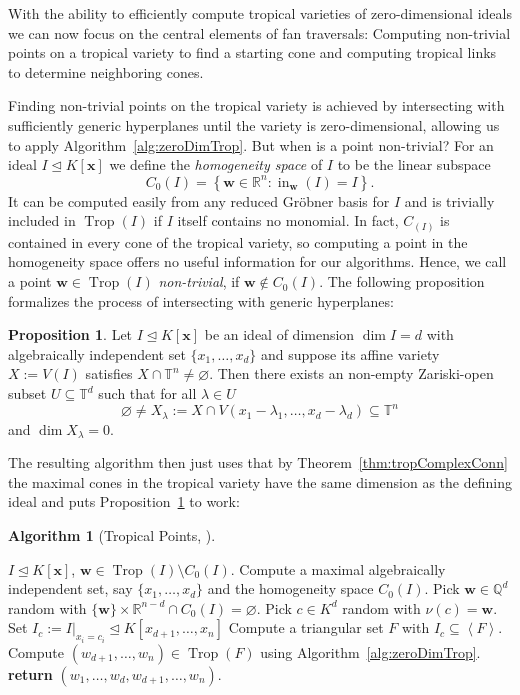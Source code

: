\documentclass[
  paper=a4,
  titlepage,
  bibliography=totoc,
  listof=totoc,
  pagesize=pdftex
]{scrartcl}
\numberwithin{figure}{section}
\numberwithin{equation}{section}
\numberwithin{table}{section}
\newcommand*\setR{\mathds{R}}
\newcommand*\setQ{\mathds{Q}}
\newcommand*\setT{\mathds{T}}
\newcommand*\ideal[1]{\left\langle #1 \right\rangle}
\let\vec\mathbf
\let\idealof\trianglelefteq
\DeclareMathOperator{\Trop}{Trop}
\DeclareMathOperator{\initial}{in}
\theoremstyle{definition}
\newtheorem{proposition}[definition]{Proposition}
\newtheorem{algo}[definition]{Algorithm}
\numberwithin{definition}{section}
\begin{document}
With the ability to efficiently compute tropical varieties of zero-dimensional ideals we
can now focus on the central elements of fan traversals: Computing non-trivial points on a
tropical variety to find a starting cone and computing tropical links to determine
neighboring cones.

Finding non-trivial points on the tropical variety is achieved by intersecting with
sufficiently generic hyperplanes until the variety is zero-dimensional, allowing us to
apply Algorithm~\ref{alg:zeroDimTrop}. But when is a point non-trivial? For an ideal $I
\idealof K[\vec x]$ we define the \emph{homogeneity space} of $I$ to be the linear
subspace
\[
  C_0(I) = \left\{ \vec w \in \setR^n : \initial_{\vec w}(I) = I \right\}.
\]
It can be computed easily from any reduced Gröbner basis for $I$ and is trivially included
in $\Trop(I)$ if $I$ itself contains no monomial. In fact, $C_(I)$ is contained in every
cone of the tropical variety, so computing a point in the homogeneity space offers no
useful information for our algorithms. Hence, we call a point $\vec w \in \Trop(I)$
\emph{non-trivial}, if $\vec w \not\in C_0(I)$. The following proposition formalizes the
process of intersecting with generic hyperplanes:

\begin{proposition}
  Let $I \idealof K[\vec x]$ be an ideal of dimension $\dim I = d$ with algebraically
  independent set $\{x_1, \dots, x_d\}$ and suppose its affine variety $X := V(I)$
  satisfies $X \cap \setT^n \neq \varnothing$. Then there exists an non-empty Zariski-open
  subset $U \subseteq \setT^d$ such that for all $\lambda \in U$
  \[
    \varnothing \neq X_\lambda :=
    X \cap V(x_1-\lambda_1, \dots, x_d - \lambda_d) \subseteq \setT^n
  \]
  and $\dim X_\lambda = 0$.
  \label{prp:intersHyperp}
\end{proposition}

The resulting algorithm then just uses that by Theorem~\ref{thm:tropComplexConn} the
maximal cones in the tropical variety have the same dimension as the defining ideal and
puts Proposition~\ref{prp:intersHyperp} to work:

\begin{algo}[Tropical Points, {\cite[Algorithm~3.3]{tropPointsLinks}}] $ $
  \begin{algorithmic}[1]
    \Require $I \idealof K[\vec x]$,
    \Ensure $\vec w \in \Trop(I) \setminus C_0(I)$.
    \State Compute a maximal algebraically independent set, say $\{x_1, \dots, x_d\}$ and
    the homogeneity space $C_0(I)$.
    \Repeat
      \State Pick $\vec w \in \setQ^d$ random with $\{\vec w\} \times \setR^{n-d} \cap
        C_0(I) = \varnothing$.
      \State Pick $c \in K^d$ random with $\nu(c) = \vec w$.
      \State Set $I_c := I|_{x_i = c_i} \idealof K[x_{d+1}, \dots, x_n]$
    \Until{$\dim(I_c) = 0$ and $V(I_c) \subseteq \setT^{n-d}$}
    \State Compute a triangular set $F$ with $I_c \subseteq \ideal F$.
    \State Compute $(w_{d+1}, \dots, w_n) \in \Trop(F)$ using
      Algorithm~\ref{alg:zeroDimTrop}.
    \State\textbf{return} $(w_1, \dots, w_d, w_{d+1}, \dots, w_n)$.
  \end{algorithmic}
  \label{alg:tropicalPoint}
\end{algo}
\end{document}
